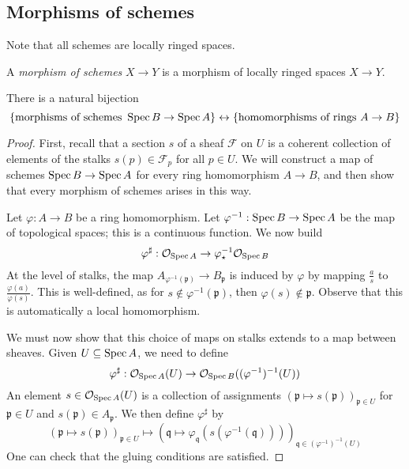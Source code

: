 \subsection{Morphisms of schemes}
Note that all schemes are locally ringed spaces.
\begin{definition}
    A \emph{morphism of schemes} \( X \to Y \) is a morphism of locally ringed spaces \( X \to Y \).
\end{definition}
\begin{theorem}
    There is a natural bijection
    \[ \qty{\text{morphisms of schemes } \operatorname{Spec}B \to \operatorname{Spec}A} \leftrightarrow \qty{\text{homomorphisms of rings } A \to B} \]
\end{theorem}
\begin{proof}
    First, recall that a section \( s \) of a sheaf \( \mathcal F \) on \( U \) is a coherent collection of elements of the stalks \( s(p) \in \mathcal F_p \) for all \( p \in U \).
    We will construct a map of schemes \( \operatorname{Spec} B \to \operatorname{Spec} A \) for every ring homomorphism \( A \to B \), and then show that every morphism of schemes arises in this way.

    Let \( \varphi : A \to B \) be a ring homomorphism.
    Let \( \varphi^{-1} : \operatorname{Spec} B \to \operatorname{Spec} A \) be the map of topological spaces; this is a continuous function.
    We now build
    \[ \varphi^\sharp : \mathcal O_{\operatorname{Spec} A} \to \varphi_\star^{-1} \mathcal O_{\operatorname{Spec} B} \]
    At the level of stalks, the map \( A_{\varphi^{-1}(\mathfrak p)} \to B_{\mathfrak p} \) is induced by \( \varphi \) by mapping \( \frac{a}{s} \) to \( \frac{\varphi(a)}{\varphi(s)} \).
    This is well-defined, as for \( s \notin \varphi^{-1}(\mathfrak p) \), then \( \varphi(s) \notin \mathfrak p \).
    Observe that this is automatically a local homomorphism.
    
    We must now show that this choice of maps on stalks extends to a map between sheaves.
    Given \( U \subseteq \operatorname{Spec} A \), we need to define
    \[ \varphi^\sharp : \mathcal O_{\operatorname{Spec} A}(U) \to \mathcal O_{\operatorname{Spec} B}((\varphi^{-1})^{-1}(U)) \]
    An element \( s \in \mathcal O_{\operatorname{Spec} A}(U) \) is a collection of assignments \( (\mathfrak p \mapsto s(\mathfrak p))_{\mathfrak p \in U} \) for \( \mathfrak p \in U \) and \( s(\mathfrak p) \in A_{\mathfrak p} \).
    We then define \( \varphi^\sharp \) by
    \[ (\mathfrak p \mapsto s(\mathfrak p))_{\mathfrak p \in U} \mapsto (\mathfrak q \mapsto \varphi_{\mathfrak q}(s(\varphi^{-1}(\mathfrak q))))_{\mathfrak q \in (\varphi^{-1})^{-1}(U)} \]
    One can check that the gluing conditions are satisfied.


\end{proof}
